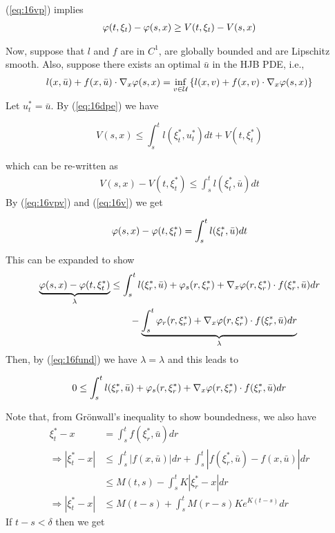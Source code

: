 (\ref{eq:16vp}) implies
\begin{align}
\label{eq:16vpv}
\varphi(t,\xi_t)-\varphi(s,x)\geq V(t,\xi_t)-V(s,x)
\end{align}

Now, suppose that $l$ and $f$ are in $C^1$, are globally bounded and are Lipschitz smooth.
Also, suppose there exists an optimal $\bar{u}$ in the HJB PDE, i.e.,
\begin{align}
\label{eq:16ubar}
l(x,\bar{u})+f(x,\bar{u})\cdot\nabla_x\varphi(s,x) = \inf_{v\in\mathcal{U}}\left\lbrace l(x,v)+f(x,v)\cdot\nabla_x\varphi(s,x)\right\rbrace
\end{align}
Let $u_t^\ast=\bar{u}$.
By (\ref{eq:16dpe}) we have

\begin{equation*}
V(s,x)\leq\int_s^t l(\xi_t^\ast,u_t^\ast)dt+V(t,\xi_t^\ast)
\end{equation*}

which can be re-written as
\begin{align}
\label{eq:16v}
V(s,x)-V(t,\xi_t^\ast)\leq\int_s^t l(\xi_t^\ast,\bar{u})dt
\end{align}
By (\ref{eq:16vpv}) and (\ref{eq:16v}) we get

\begin{equation*}
\varphi(s,x)-\varphi(t,\xi_t^\ast) = \int_s^t l(\xi_t^\ast,\bar{u})dt
\end{equation*}

This can be expanded to show
\begin{align*}
\underbrace{\varphi(s,x) - \varphi(t,\xi_t^\ast)}_{\lambda} &\leq \int_s^t l(\xi_r^\ast,\bar{u}) + \varphi_s(r,\xi_r^\ast) + \nabla_x\varphi(r,\xi_r^\ast)\cdot f(\xi_r^\ast,\bar{u})dr \\
&\qquad - \underbrace{\int_s^t\varphi_r(r,\xi_r^\ast) + \nabla_x\varphi(r,\xi_r^\ast)\cdot f(\xi_r^\ast,\bar{u})dr}_{\lambda}
\end{align*}
Then, by (\ref{eq:16fund}) we have $\lambda=\lambda$ and this leads to

\begin{equation*}
0\leq\int_s^t l(\xi_r^\ast,\bar{u}) + \varphi_s(r,\xi_r^\ast) + \nabla_x\varphi(r,\xi_r^\ast)\cdot f(\xi_r^\ast,\bar{u})dr
\end{equation*}

Note that, from Gr\"onwall's inequality to show boundedness, we also have
\begin{align*}
\xi_t^\ast-x &= \int_s^t f(\xi_r^\ast,\bar{u})dr \\
\Rightarrow |\xi_t^\ast-x| &\leq \int_s^t|f(x,\bar{u})|dr + \int_s^t|f(\xi_r^\ast,\bar{u})-f(x,\bar{u})|dr \\
&\leq M(t,s)-\int_s^t K|\xi_r^\ast-x|dr \\
\Rightarrow |\xi_t^\ast-x| &\leq M(t-s) + \int_s^t M(r-s)Ke^{K(t-s)}dr
\end{align*}
If $t-s<\delta$ then we get

